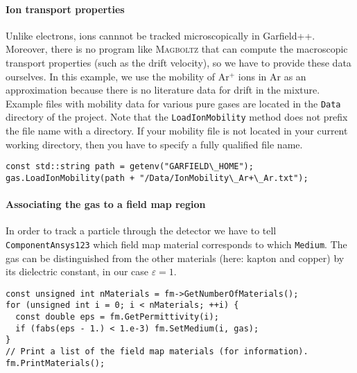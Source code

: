 \paragraph{Ion transport properties}
Unlike electrons, ions cannnot be tracked microscopically in Garfield++.
Moreover, there is no program like \textsc{Magboltz} that can compute  
the macroscopic transport properties (such as the drift velocity),
so we have to provide these data ourselves.
In this example, we use the mobility of Ar$^{+}$ ions in Ar
as an approximation because there is no literature data for drift in the
mixture.
Example files with mobility data for various pure gases are located
in the \texttt{Data} directory of the project.
Note that the \texttt{LoadIonMobility} method does not prefix
the file name with a directory.
If your mobility file is not located in your current working directory,
then you have to specify a fully qualified file name.
\begin{lstlisting}
const std::string path = getenv("GARFIELD\_HOME");
gas.LoadIonMobility(path + "/Data/IonMobility\_Ar+\_Ar.txt");
\end{lstlisting}
\paragraph{Associating the gas to a field map region}
In order to track a particle through the detector we have to 
tell \texttt{ComponentAnsys123} which field map material corresponds 
to which \texttt{Medium}.
The gas can be distinguished from the other materials
(here: kapton and copper) by its dielectric constant, in our case
$\varepsilon = 1$.
\begin{lstlisting}
const unsigned int nMaterials = fm->GetNumberOfMaterials();
for (unsigned int i = 0; i < nMaterials; ++i) {
  const double eps = fm.GetPermittivity(i);
  if (fabs(eps - 1.) < 1.e-3) fm.SetMedium(i, gas);
}
// Print a list of the field map materials (for information).
fm.PrintMaterials();
\end{lstlisting}


